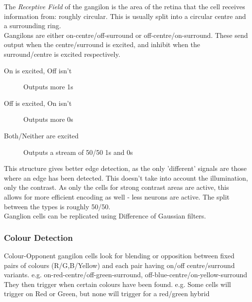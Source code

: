 The \emph{Receptive Field} of the gangilon is the area of the retina that the cell receives information from: roughly circular. This is usually split into a circular centre and a surrounding ring. \\

Gangilons are either on-centre/off-surround or off-centre/on-surround. These send output when the centre/surround is excited, and inhibit when the surround/centre is excited respectively. 
\begin{description}
    \item [On is excited, Off isn't] Outputs more 1s
    \item[Off is excited, On isn't] Outputs more 0s
    \item[Both/Neither are excited] Outputs a stream of 50/50 1s and 0s
\end{description}
This structure gives better edge detection, as the only 'different' signals are those where an edge has been detected. This doesn't take into account the illumination, only the contrast. As only the cells for strong contrast areas are active, this allows for more efficient encoding as well - less neurons are active. The split between the types is roughly 50/50. \\

Ganglion cells can be replicated using Difference of Gaussian filters.

\subsubsection{Colour Detection}
Colour-Opponent gangilon cells look for blending or opposition between fixed pairs of colours (R/G,B/Yellow) and each pair having on/off centre/surround variants. e.g. on-red-centre/off-green-surround, off-blue-centre/on-yellow-surround \\

They then trigger when certain colours have been found. e.g. Some cells will trigger on Red or Green, but none will trigger for a red/green hybrid